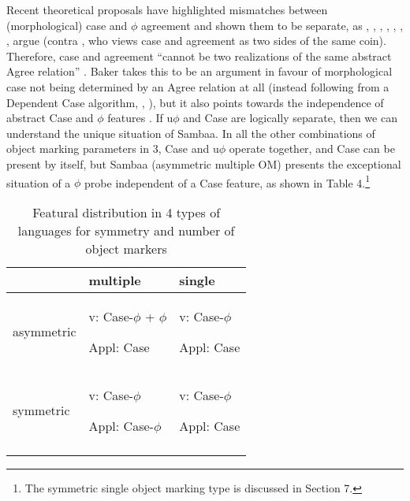 \documentclass[output=paper
,modfonts
,nonflat]{langsci/langscibook}
\begin{document}
Recent theoretical proposals have highlighted mismatches between (morphological) case and $\phi$ agreement and shown them to be separate, as 
\citet{Bhatt2005}, 
\citet{Baker2008a},  
\citet{Baker2008b}, 
\citet{Baker2012}, 
\citet{Baker2015}, 
\citet{Bobaljik2008}, 
\citet{Barany2015}, 
\citet{Stegovec2015}
argue (contra \citealt{Chomsky2000}, \citealt{Chomsky2001} who views case and agreement as two sides of the same coin). Therefore, case and agreement “cannot be two realizations of the same abstract Agree relation” \citep[272 on Amharic]{Baker2012}. Baker takes this to be an argument in favour of morphological case not being determined by an Agree relation at all (instead following from a Dependent Case algorithm, \citealt{Marantz1991}, \citealt{Baker2015}), but it also points towards the independence of abstract Case and $\phi$ features \citep{Keine2010, Bárány2015}. If u$\phi$ and Case are logically separate, then we can understand the unique situation of Sambaa. In all the other combinations of object marking parameters in 3, Case and u$\phi$ operate together, and Case can be present by itself, but Sambaa (asymmetric multiple OM) presents the exceptional situation of a $\phi$ probe independent of a Case feature, as shown in Table 4.\footnote{The symmetric single object marking type is discussed in Section 7.}
\begin{table}
\label{Table 4}
\caption{Featural distribution in 4 types of languages for symmetry and number of object markers} 
	\begin{tabularx}{\textwidth}{XXX} 
	\lsptoprule	
		& multiple & single\\
	\midrule
		asymmetric & v:       Case-$\phi$ + $\phi$ 
		
		Appl: Case & { v:       Case-$\phi$} 
		
		Appl: Case\\ 
	\midrule
		symmetric & { v:       Case-$\phi$} 
		
		Appl: Case-$\phi$ & { v: Case-$\phi$} 
		
		Appl: Case\\
	\lspbottomrule		
	\end{tabularx}
\end{table}
\end{document}
